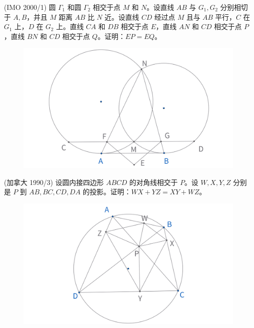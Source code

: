 \newpage 
\begin{exercise}
    (IMO 2000/1) 圆 $\Gamma_1$ 和圆 $\Gamma_2$ 相交于点 $M$ 和 $N$。设直线 $AB$ 与 $G_1, G_2$ 分别相切于 $A, B$，并且 $M$ 距离 $AB$ 比 $N$ 近。设直线 $CD$ 经过点 $M$ 且与 $AB$ 平行，$C$ 在 $G_1$ 上，$D$ 在 $G_2$ 上。直线 $CA$ 和 $DB$ 相交于点 $E$，直线 $AN$ 和 $CD$ 相交于点 $P$，直线 $BN$ 和 $CD$ 相交于点 $Q$。证明：$EP = EQ$。
\end{exercise}
\begin{figure}[H]
    \centering
    \includegraphics[width=0.7\linewidth]{figures/exercises/233.png}
\end{figure}



\begin{exercise}
    (加拿大 1990/3) 设圆内接四边形 $ABCD$ 的对角线相交于 $P$。设 $W, X, Y, Z$ 分别是 $P$ 到 ${AB}, {BC}, {CD}, {DA}$ 的投影。证明：$WX + YZ = XY + WZ$。
\end{exercise}
\begin{figure}[H]
    \centering
    \includegraphics[width=0.7\linewidth]{figures/exercises/234.png}
\end{figure}


